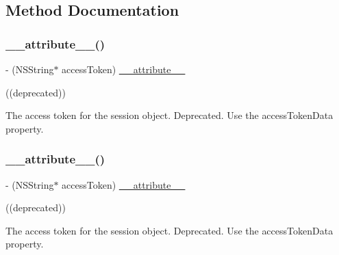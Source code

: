 \subsection{Method Documentation}
\mbox{\label{interfaceFBSession_a129a9e2b497ba201043bb82244156341}} 
\subsubsection{\texorpdfstring{\+\_\+\+\_\+attribute\+\_\+\+\_\+()}{\_\_attribute\_\_()}\hspace{0.1cm}{\footnotesize\ttfamily [1/25]}}
{\footnotesize\ttfamily -\/ (N\+S\+String$\ast$ access\+Token) \hyperlink{struct____attribute____}{\+\_\+\+\_\+attribute\+\_\+\+\_\+} \begin{DoxyParamCaption}\item[{((deprecated))}]{ }\end{DoxyParamCaption}}

The access token for the session object.  Deprecated. Use the {\ttfamily access\+Token\+Data} property. \mbox{\label{interfaceFBSession_a129a9e2b497ba201043bb82244156341}} 
\subsubsection{\texorpdfstring{\+\_\+\+\_\+attribute\+\_\+\+\_\+()}{\_\_attribute\_\_()}\hspace{0.1cm}{\footnotesize\ttfamily [2/25]}}
{\footnotesize\ttfamily -\/ (N\+S\+String$\ast$ access\+Token) \hyperlink{struct____attribute____}{\+\_\+\+\_\+attribute\+\_\+\+\_\+} \begin{DoxyParamCaption}\item[{((deprecated))}]{ }\end{DoxyParamCaption}}

The access token for the session object.  Deprecated. Use the {\ttfamily access\+Token\+Data} property. \mbox{\label{interfaceFBSession_a129a9e2b497ba201043bb82244156341}} 
